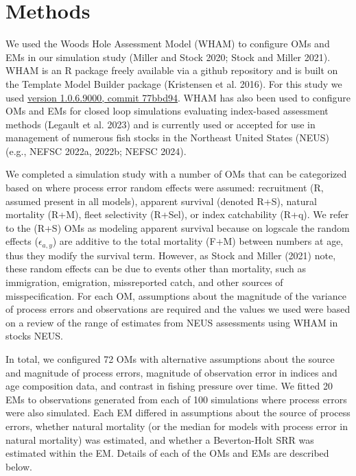 \documentclass[
  12pt,
]{article}
\begin{document}
\hypertarget{methods}{%
\section*{Methods}\label{methods}}

We used the Woods Hole Assessment Model (WHAM) to configure OMs and EMs
in our simulation study (Miller and Stock 2020; Stock and Miller 2021).
WHAM is an R package freely available via a github repository and is
built on the Template Model Builder package (Kristensen et al. 2016).
For this study we used
\href{https://github.com/timjmiller/wham/tree/77bbd946e4881216a439933473d1c58b21c270c3}{version
1.0.6.9000, commit 77bbd94}. WHAM has also been used to configure OMs
and EMs for closed loop simulations evaluating index-based assessment
methods (Legault et al. 2023) and is currently used or accepted for use
in management of numerous fish stocks in the Northeast United States
(NEUS) (e.g., NEFSC 2022a, 2022b; NEFSC 2024).

We completed a simulation study with a number of OMs that can be
categorized based on where process error random effects were assumed:
recruitment (R, assumed present in all models), apparent survival
(denoted R+S), natural mortality (R+M), fleet selectivity (R+Sel), or
index catchability (R+q). We refer to the (R+S) OMs as modeling apparent
survival because on logscale the random effects (\(\epsilon_{a,y}\)) are
additive to the total mortality (F+M) between numbers at age, thus they
modify the survival term. However, as Stock and Miller (2021) note,
these random effects can be due to events other than mortality, such as
immigration, emigration, missreported catch, and other sources of
misspecification. For each OM, assumptions about the magnitude of the
variance of process errors and observations are required and the values
we used were based on a review of the range of estimates from NEUS
assessments using WHAM in stocks NEUS.

In total, we configured 72 OMs with alternative assumptions about the
source and magnitude of process errors, magnitude of observation error
in indices and age composition data, and contrast in fishing pressure
over time. We fitted 20 EMs to observations generated from each of 100
simulations where process errors were also simulated. Each EM differed
in assumptions about the source of process errors, whether natural
mortality (or the median for models with process error in natural
mortality) was estimated, and whether a Beverton-Holt SRR was estimated
within the EM. Details of each of the OMs and EMs are described below.
\end{document}
